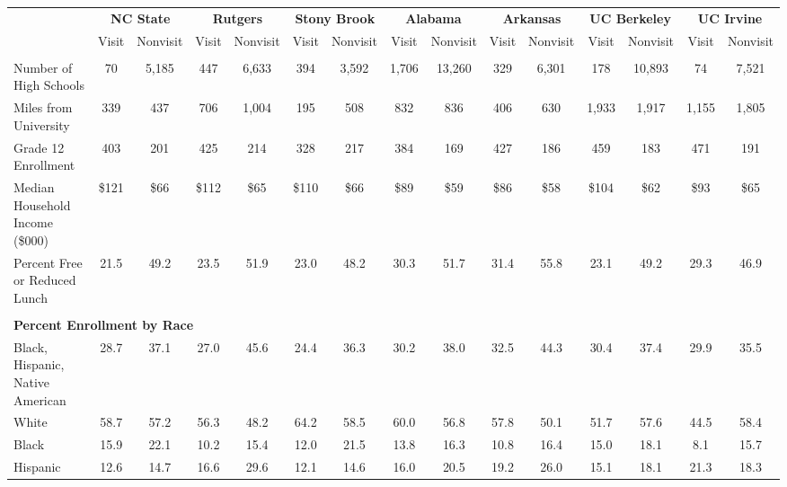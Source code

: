\begin{tabular*}{\linewidth}{@{\extracolsep{\fill} } lcccccccccccccc}%
&\multicolumn{2}{c}{\bfseries NC State}&\multicolumn{2}{c}{\bfseries Rutgers}&\multicolumn{2}{c}{\bfseries Stony Brook}&\multicolumn{2}{c}{\bfseries Alabama}&\multicolumn{2}{c}{\bfseries Arkansas}&\multicolumn{2}{c}{\bfseries UC Berkeley}&\multicolumn{2}{c}{\bfseries UC Irvine}\\%
&Visit&\multicolumn{1}{l}{Nonvisit}&Visit&\multicolumn{1}{l}{Nonvisit}&Visit&\multicolumn{1}{l}{Nonvisit}&Visit&\multicolumn{1}{l}{Nonvisit}&Visit&\multicolumn{1}{l}{Nonvisit}&Visit&\multicolumn{1}{l}{Nonvisit}&Visit&\multicolumn{1}{l}{Nonvisit}\\%
\hline%
&&&&&&&&&&&&&&\\%
\hspace{0cm}Number of High Schools&70&5,185&447&6,633&394&3,592&1,706&13,260&329&6,301&178&10,893&74&7,521\\%
\hspace{0cm}Miles from University&339&437&706&1,004&195&508&832&836&406&630&1,933&1,917&1,155&1,805\\%
\hspace{0cm}Grade 12 Enrollment&403&201&425&214&328&217&384&169&427&186&459&183&471&191\\%
\hspace{0cm}Median Household Income (\$000)&\$121&\$66&\$112&\$65&\$110&\$66&\$89&\$59&\$86&\$58&\$104&\$62&\$93&\$65\\%
\hspace{0cm}Percent Free or Reduced Lunch&21.5&49.2&23.5&51.9&23.0&48.2&30.3&51.7&31.4&55.8&23.1&49.2&29.3&46.9\\%
&&&&&&&&&&&&&&\\%
\multicolumn{15}{l}{\bfseries Percent Enrollment by Race}\\%
\hspace{0.2cm}Black, Hispanic, Native American&28.7&37.1&27.0&45.6&24.4&36.3&30.2&38.0&32.5&44.3&30.4&37.4&29.9&35.5\\%
\hspace{0.2cm}White&58.7&57.2&56.3&48.2&64.2&58.5&60.0&56.8&57.8&50.1&51.7&57.6&44.5&58.4\\%
\hspace{0.2cm}Black&15.9&22.1&10.2&15.4&12.0&21.5&13.8&16.3&10.8&16.4&15.0&18.1&8.1&15.7\\%
\hspace{0.2cm}Hispanic&12.6&14.7&16.6&29.6&12.1&14.6&16.0&20.5&19.2&26.0&15.1&18.1&21.3&18.3\\%

\end{tabular*}
